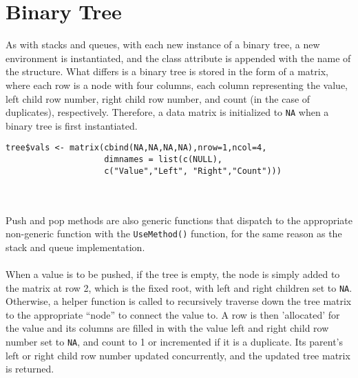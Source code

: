 \documentclass{article}
\begin{document}
\section{Binary Tree}

As with stacks and queues, with each new instance of a binary tree, a new environment is instantiated, and the class attribute is appended with the name of the structure. What differs is a binary tree is stored in the form of a matrix, where each row is a node with four columns, each column representing the value, left child row number, right child row number, and count (in the case of duplicates), respectively. Therefore, a data matrix is initialized to \texttt{NA} when a binary tree is first instantiated.
\begin{lstlisting}
tree$vals <- matrix(cbind(NA,NA,NA,NA),nrow=1,ncol=4, 
                    dimnames = list(c(NULL), 
                    c("Value","Left", "Right","Count"))) 
\end{lstlisting}
\\\\ Push and pop methods are also generic functions that dispatch to the appropriate non-generic function with the \texttt{UseMethod()} function, for the same reason as the stack and queue implementation. 
\\\\ When a value is to be pushed, if the tree is empty, the node is simply added to the matrix at row 2, which is the fixed root, with left and right children set to \texttt{NA}. Otherwise, a helper function is called to recursively traverse down the tree matrix to the appropriate “node” to connect the value to. A row is then 'allocated' for the value and its columns are filled in with the value left and right child row number set to \texttt{NA}, and count to 1 or incremented if it is a duplicate. Its parent’s left or right child row number updated concurrently, and the updated tree matrix is returned.
\end{document}
